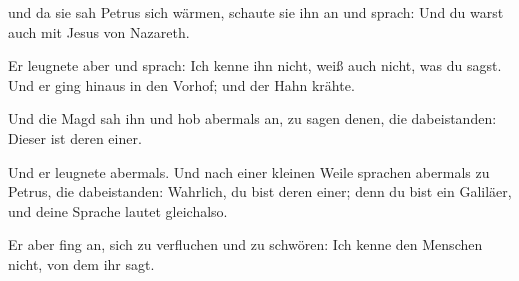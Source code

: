  und da sie sah Petrus sich wärmen, schaute sie ihn an und
sprach: Und du warst auch mit Jesus von Nazareth.

 Er leugnete aber und sprach: Ich kenne ihn nicht, weiß
auch nicht, was du sagst. Und er ging hinaus in den Vorhof; und der Hahn
krähte.

 Und die Magd sah ihn und hob abermals an, zu sagen denen,
die dabeistanden: Dieser ist deren einer.

 Und er leugnete abermals. Und nach einer kleinen Weile
sprachen abermals zu Petrus, die dabeistanden: Wahrlich, du bist deren
einer; denn du bist ein Galiläer, und deine Sprache lautet gleichalso.

 Er aber fing an, sich zu verfluchen und zu schwören: Ich
kenne den Menschen nicht, von dem ihr sagt.

